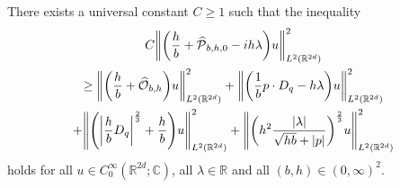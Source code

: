 \documentclass[AHL,Unicode,longabstracts]{cedram}
\newcommand{\C}{\mathbb{C}}
\newcommand{\R}{\mathbb{R}}
\newcommand{\clO}{\mathcal{O}}
\newcommand{\clP}{\mathcal{P}}
\let\oldhat\hat
\renewcommand*{\hat}[1]{\mathchoice{\widehat{#1}}{\widehat{#1}}{\oldhat{#1}}{\oldhat{#1}}}
\let\originalleft\left
\let\originalright\right
\renewcommand{\left}{\mathopen{}\mathclose\bgroup\originalleft}
\renewcommand{\right}{\aftergroup\egroup\originalright}
\begin{document}
\begin{prop}\label{pr:SubellipticEstimateEuclidianCase}
There exists a universal constant $C\geq 1$ such that the inequality
\begin{multline}\label{eq:LowerBoundWithParameterbh}
C\left\| \left(\frac{h}{b}+ \hat{\clP}_{b,h,0} -ih\lambda\right)u \right\|^{2}_{L^2(\R^{2d})}\\
\geq \left\| \left(\frac{h}{b}+\hat{\clO}_{b,h}\right)u\right\|^{2}_{L^2(\R^{2d})} + \left\|\left(\frac{1}{b}p\cdot D_q -h\lambda\right)u\right\|^{2}_{L^2(\R^{2d})} \\
+ \left\|\left(\left|\frac{h}{b}D_{q}\right|^{\frac{2}{3}}+\frac{h}{b}\right)u\right\|^{2}_{L^2(\R^{2d})} +
\left\|
\left(h^{2}\frac{|\lambda|}{\sqrt{hb}+|p|}
\right)^{\frac{2}{3}} u
\right\|^{2}_{L^2(\R^{2d})}
\end{multline}
holds for all $u \in C^\infty_0(\R^{2d};\C)$, all $\lambda \in \R$ and all $(b,h) \in (0,\infty)^2$.
\end{prop}
\end{document}
